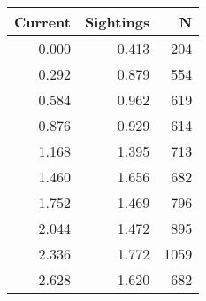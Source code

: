 \begin{tabular}{rrr}
\toprule
 Current &  Sightings &    N \\
\midrule
   0.000 &      0.413 &  204 \\
   0.292 &      0.879 &  554 \\
   0.584 &      0.962 &  619 \\
   0.876 &      0.929 &  614 \\
   1.168 &      1.395 &  713 \\
   1.460 &      1.656 &  682 \\
   1.752 &      1.469 &  796 \\
   2.044 &      1.472 &  895 \\
   2.336 &      1.772 & 1059 \\
   2.628 &      1.620 &  682 \\
\bottomrule
\end{tabular}
